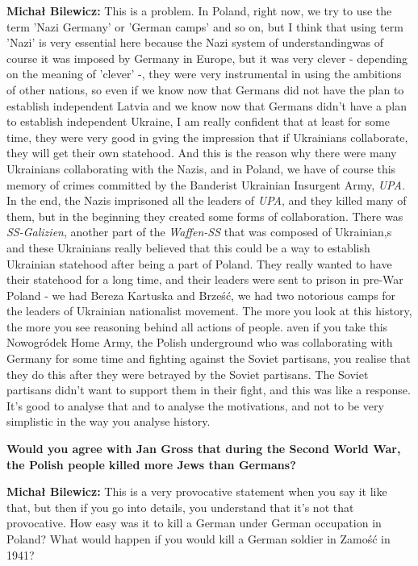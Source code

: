 \textbf{Michał Bilewicz:} This is a problem. In Poland, right now, we try to use the term 'Nazi Germany' or 'German camps' and so on, but I think that using term 'Nazi' is very essential here because the Nazi system of understandingwas of course it was imposed by Germany in Europe, but it was very clever - depending on the meaning of 'clever' -, they were very instrumental in using the ambitions of other nations, so even if we know now that Germans did not have  the plan to establish independent Latvia and we know now that Germans didn't have a plan to establish independent Ukraine, I am really confident that at least for some time, they were very good in gving the impression that if Ukrainians collaborate, they will get their own statehood. And this is the reason why there were many Ukrainians collaborating with the Nazis, and in Poland, we have of course this memory of crimes committed by the Banderist Ukrainian Insurgent Army, \textit{UPA}. In the end, the Nazis imprisoned all the leaders of \textit{UPA}, and they killed many of them, but in the beginning they created some forms of collaboration. There was \textit{SS-Galizien}, another part of the \textit{Waffen-SS} that was composed of Ukrainian,s and these Ukrainians really believed that this could be a way to establish Ukrainian statehood after being a part of Poland. They really wanted to have their statehood for a long time, and their leaders were sent to prison in pre-War Poland - we had Bereza Kartuska and Brześć, we had two notorious camps for the leaders of Ukrainian nationalist movement. The more you look at this history, the more you see reasoning behind all actions of people. aven if you take this Nowogródek Home Army, the Polish underground who was collaborating with Germany for some time and fighting against the Soviet partisans, you realise that they do this after they were betrayed by the Soviet partisans. The Soviet partisans didn't want to support them in their fight, and this was like a response. It's good to analyse that and to analyse the motivations, and not to be very simplistic in the way you analyse history. 

\textbf{Would you agree with Jan Gross that during the Second World War, the Polish people killed more Jews than Germans?}

\textbf{Michał Bilewicz:} This is a very provocative statement when you say it like that, but then if you go into details, you understand that it's not that provocative. How easy was it to kill a German under German occupation in Poland? What would happen if you would kill a German soldier in Zamość in 1941?

